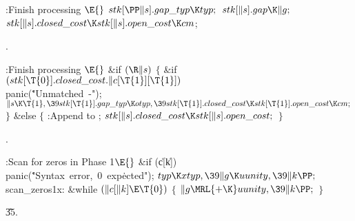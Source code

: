 \B{}:Finish processing \X${}\E{}$\6
$\\{stk}[\PP\|s].\\{gap\_typ}\K\\{typ};{}$\6
${}\\{stk}[\|s].\\{gap}\K\|g;{}$\6
${}\\{stk}[\|s].\\{closed\_cost}\K\\{stk}[\|s].\\{open\_cost}\K\\{cm}{}$;\par
{}.\fi

\B{}:Finish processing \X${}\E{}$\6
\&{if} ${}(\R\|s){}$\5
${}\{{}$\1\6
\&{if} ${}(\\{stk}[\T{0}].\\{closed\_cost}.\|c[\T{1}][\T{1}]){}$\1\5
\\{panic}(\.{"Unmatched\ -"});\2\6
${}\|s\K\T{1},\39\\{stk}[\T{1}].\\{gap\_typ}\K\\{otyp},\39\\{stk}[\T{1}].%
\\{closed\_cost}\K\\{stk}[\T{1}].\\{open\_cost}\K\\{cm};{}$\6
\4${}\}{}$\5
\2\&{else}\5
${}\{{}$\1\6
:Append  to \X;\6
${}\\{stk}[\|s].\\{closed\_cost}\K\\{stk}[\|s].\\{open\_cost};{}$\6
\4${}\}{}$\2\par
{}.\fi

\B{}:Scan for zeros in Phase 1\X${}\E{}$\6
\&{if} (\|c[\|k])\1\5
\\{panic}(\.{"Syntax\ error,\ 0\ exp}\)\.{ected"});\2\6
${}\\{typ}\K\\{xtyp},\39\|g\K\\{uunity},\39\|k\PP;{}$\6
\4\\{scan\_zeros1x}:\5
\&{while} ${}(\|c[\|k]\E\T{0}){}$\5
${}\{{}$\1\6
${}\|g\MRL{+{\K}}\\{uunity},\39\|k\PP;{}$\6
\4${}\}{}$\2\par
\U35.\fi

